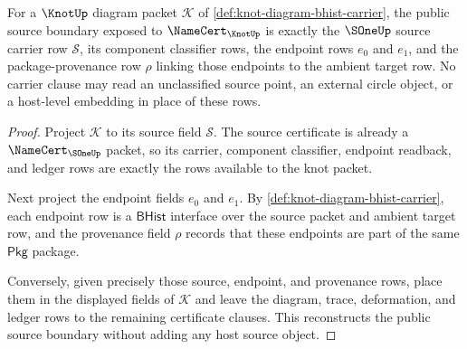 \begin{theorem}
\label{thm:knot-sone-source-boundary}
For a $\KnotUp$ diagram packet $\mathcal{K}$ of
\autoref{def:knot-diagram-bhist-carrier}, the public source boundary exposed
to $\NameCert_{\KnotUp}$ is exactly the $\SOneUp$ source carrier row
$\mathcal{S}$, its component classifier rows, the endpoint rows $e_0$ and
$e_1$, and the package-provenance row $\rho$ linking those endpoints to the
ambient target row. No carrier clause may read an unclassified source point,
an external circle object, or a host-level embedding in place of these rows.
\end{theorem}
\begin{proof}
Project $\mathcal{K}$ to its source field $\mathcal{S}$. The source
certificate is already a $\NameCert_{\SOneUp}$ packet, so its carrier,
component classifier, endpoint readback, and ledger rows are exactly the rows
available to the knot packet.

Next project the endpoint fields $e_0$ and $e_1$. By
\autoref{def:knot-diagram-bhist-carrier}, each endpoint row is a
$\mathsf{BHist}$ interface over the source packet and ambient target row, and
the provenance field $\rho$ records that these endpoints are part of the same
$\mathsf{Pkg}$ package.

Conversely, given precisely those source, endpoint, and provenance rows,
place them in the displayed fields of $\mathcal{K}$ and leave the diagram,
trace, deformation, and ledger rows to the remaining certificate clauses. This
reconstructs the public source boundary without adding any host source object.
\end{proof}

